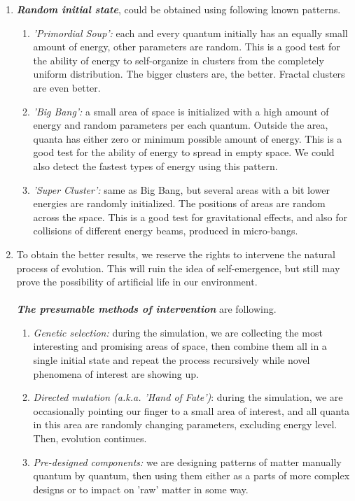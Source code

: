 \documentclass[a4paper,12pt,tikz,UTF8]{article}
\begin{document}
\begin{enumerate}
    \item \textbf{\textit{Random initial state}}, could be obtained using following known patterns.
      \begin{enumerate}
        \item \textit{'Primordial Soup':} each and every quantum initially has an equally small amount of energy, other parameters are random. This is a good test for the ability of energy to self-organize in clusters from the completely uniform distribution. The bigger clusters are, the better. Fractal clusters are even better.
        \item \textit{'Big Bang':} a small area of space is initialized with a high amount of energy and random parameters per each quantum. Outside the area, quanta has either zero or minimum possible amount of energy. This is a good test for the ability of energy to spread in empty space. We could also detect the fastest types of energy using this pattern. 
        \item \textit{'Super Cluster':} same as Big Bang, but several areas with a bit lower energies are randomly initialized. The positions of areas are random across the space. This is a good test for gravitational effects, and also for collisions of different energy beams, produced in micro-bangs.
      \end{enumerate}

    \item To obtain the better results, we reserve the rights to intervene the natural process of evolution. This will ruin the idea of self-emergence, but still may prove the possibility of artificial life in our environment.\\\\
          \textbf{\textit{The presumable methods of intervention}} are following.
      \begin{enumerate}
        \item \textit{Genetic selection:} during the simulation, we are collecting the most interesting and promising areas of space, then combine them all in a single initial state and repeat the process recursively while novel phenomena of interest are showing up.
        \item \textit{Directed mutation (a.k.a. 'Hand of Fate')}: during the simulation, we are occasionally pointing our finger to a small area of interest, and all quanta in this area are randomly changing parameters, excluding energy level. Then, evolution continues. 
        \item \textit{Pre-designed components:} we are designing patterns of matter manually quantum by quantum, then using them either as a parts of more complex designs or to impact on 'raw' matter in some way.
      \end{enumerate}

  \end{enumerate}
\end{document}
